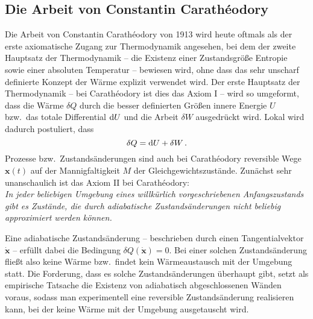 \subsection{Die Arbeit von Constantin Carath\'{e}odory}

Die Arbeit von Constantin Carath\'{e}odory von 1913 \cite{Caratheodory} wird heute oftmals als der
erste axiomatische Zugang zur Thermodynamik angesehen, bei dem der zweite Hauptsatz der
Thermodynamik -- die Existenz einer Zustandsgr\"o\ss e Entropie sowie einer absoluten Temperatur --
bewiesen wird, ohne dass das sehr unscharf definierte Konzept der W\"arme explizit verwendet wird.  
Der erste Hauptsatz der Thermodynamik -- bei Carath\'{e}odory ist dies das Axiom I -- wird
so umgeformt, dass die W\"arme $\delta Q$ durch die besser definierten Gr\"o\ss en innere Energie $U$ 
bzw.\ das totale Differential ${\rm d}U$ und die Arbeit $\delta W$ ausgedr\"uckt wird. Lokal 
wird dadurch postuliert, dass
\begin{equation}
                          \delta Q = {\rm d}U + \delta W \, .
\end{equation}
Prozesse bzw.\ Zustands\"anderungen sind auch bei Carath\'{e}odory reversible Wege $\pmb{x}(t)$ 
auf der Mannigfaltigkeit $M$ der Gleichgewichtszust\"ande. Zun\"achst sehr unanschaulich 
ist das Axiom II bei Carath\'{e}odory:\\[0.3cm]
\textit{In jeder beliebigen Umgebung eines willk\"urlich vorgeschriebenen Anfangszustands
gibt es Zust\"ande, die durch adiabatische Zustands\"anderungen nicht beliebig approximiert
werden k\"onnen.}
\vspace{0.3cm}

Eine adiabatische Zustands\"anderung -- beschrieben durch einen Tangentialvektor $\dot{\pmb{x}}$ --
erf\"ullt dabei die Bedingung $\delta Q(\dot{\pmb{x}})=0$. 
Bei einer solchen Zustands\"anderung flie\ss t
also keine W\"arme bzw.\ findet kein W\"armeaustausch mit der Umgebung statt. Die Forderung, dass es 
solche Zustands\"anderungen \"uberhaupt gibt, 
setzt als empirische Tatsache die Existenz von adiabatisch abgeschlossenen W\"anden voraus, sodass man
experimentell eine reversible Zustands\"anderung realisieren kann, bei der keine W\"arme mit der Umgebung
ausgetauscht wird. 

